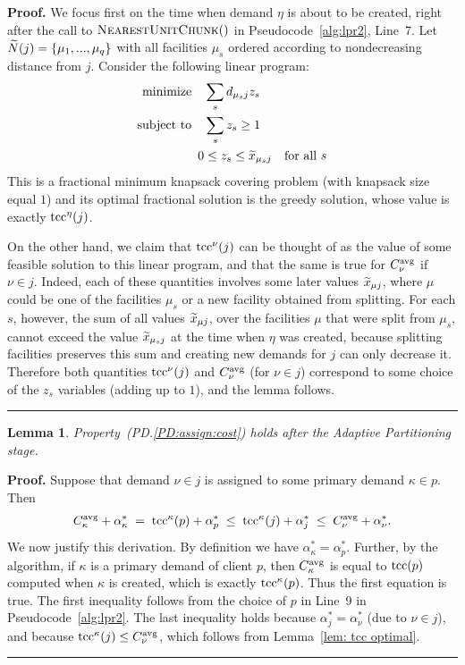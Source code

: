 \documentclass[oneside,final]{ucr}
\newtheorem{lemma}[theorem]{Lemma}
\newenvironment{proof}[1][Proof]{\textbf{#1.} }{\ \rule{0.5em}{0.5em}}
\begin{document}
\begin{proof}
  We focus first on the time when demand $\eta$ is about to be created,
  right after the call to ${\textsc{NearestUnitChunk}}()$ in
  Pseudocode~\ref{alg:lpr2}, Line~7.  Let ${\widetilde N}(j) =
  \{\mu_1,...,\mu_q\}$ with all facilities $\mu_s$ ordered
  according to nondecreasing distance from $j$.  Consider
  the following linear program:
%
\begin{alignat*}{1}
	\textrm{minimize} \quad & \sum_s d_{\mu_s j}z_s
			\\
	\textrm{subject to} \quad & \sum_s z_s  \ge 1
			\\
 	0 &\le z_s \le {\widetilde x}_{\mu_s j} \quad \textrm{for all}\ s
\end{alignat*}
%
  This is a fractional
  minimum knapsack covering problem (with knapsack size equal $1$) and its optimal fractional
  solution is the greedy solution, whose value is exactly
  $\mbox{\rm{tcc}}^\eta(j)$.  

On the other hand, we claim that
  $\mbox{\rm{tcc}}^{\nu}(j)$ can be thought of as the value of some feasible
  solution to this linear program, and that the same is true for $C^{{\mbox{\scriptsize\rm avg}}}_{\nu}$ if $\nu\in j$.
  Indeed, each of these
  quantities involves some later values ${\widetilde x}_{\mu j}$,
  where $\mu$ could be one of the facilities $\mu_s$ or a
  new facility obtained from splitting. For each $s$,
  however, the sum of all values ${\widetilde x}_{\mu j}$,
  over the facilities $\mu$ that were split from $\mu_s$, cannot exceed
 the value ${\widetilde x}_{\mu_s j}$ at the time when
  $\eta$ was created, because splitting facilities preserves this sum and
 creating new demands for $j$ can only decrease it.
Therefore both quantities
  $\mbox{\rm{tcc}}^{\nu}(j)$ and $C^{{\mbox{\scriptsize\rm avg}}}_{\nu}$ (for $\nu\in j$) correspond to some
  choice of the $z_s$ variables (adding up to $1$), and the
  lemma follows.
\end{proof}


\begin{lemma}\label{lem: PD:assign:cost holds}
Property~(PD.\ref{PD:assign:cost}) holds after the Adaptive Partitioning stage.
\end{lemma}

\begin{proof}
Suppose that demand $\nu\in j$ is assigned to some primary demand $\kappa\in p$.
Then
%
\begin{eqnarray*}
 C^{{\mbox{\scriptsize\rm avg}}}_{\kappa} + \alpha_{\kappa}^\ast \;=\; \mbox{\rm{tcc}}^{\kappa}(p) + \alpha^\ast_p
 					\;\le\; \mbox{\rm{tcc}}^{\kappa}(j) + \alpha^\ast_j   
					\;\le\; C^{{\mbox{\scriptsize\rm avg}}}_{\nu} + \alpha^\ast_\nu.
\end{eqnarray*}
%
We now justify this derivation. By definition we have
$\alpha_{\kappa}^\ast = \alpha^\ast_p$.  Further, by the
algorithm, if $\kappa$ is a primary demand of client $p$,
then $C^{{\mbox{\scriptsize\rm avg}}}_{\kappa}$ is equal to $\mbox{\rm{tcc}}(p)$ computed when
$\kappa$ is created, which is exactly $\mbox{\rm{tcc}}^{\kappa}(p)$. Thus
the first equation is true. The first inequality follows
from the choice of $p$ in Line~9 in
Pseudocode~\ref{alg:lpr2}. The last inequality holds
because $\alpha^\ast_j = \alpha^\ast_\nu$ (due to $\nu\in
j$), and because $\mbox{\rm{tcc}}^{\kappa}(j) \le C^{{\mbox{\scriptsize\rm avg}}}_{\nu}$, which
follows from Lemma~\ref{lem: tcc optimal}.
\end{proof}
\end{document}
